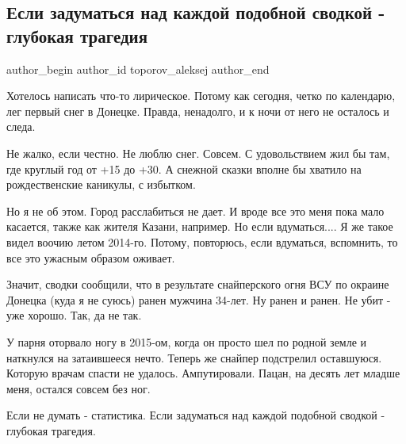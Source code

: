  
 
 
 
 
 
\subsection{Если задуматься над каждой подобной сводкой - глубокая трагедия}
\label{sec:01_12_2021.fb.toporov_aleksej.1.svodki_vojna}
 
\ifcmt
 author_begin
   author_id toporov_aleksej
 author_end
\fi

Хотелось написать что-то лирическое. Потому как сегодня, четко по календарю,
лег первый снег в Донецке. Правда, ненадолго, и к ночи от него не осталось и
следа.

Не жалко, если честно. Не люблю снег. Совсем. С удовольствием жил бы там, где
круглый год от +15 до +30. А снежной сказки вполне бы хватило на рождественские
каникулы, с избытком.

Но я не об этом. Город расслабиться не дает. И вроде все это меня пока мало
касается, также как жителя Казани, например. Но если вдуматься.... Я же такое
видел воочию летом 2014-го. Потому, повторюсь, если вдуматься, вспомнить, то
все это ужасным образом оживает.

Значит, сводки сообщили, что в результате снайперского огня ВСУ по окраине
Донецка (куда я не суюсь) ранен мужчина 34-лет. Ну ранен и ранен. Не убит - уже
хорошо. Так, да не так. 

У парня оторвало ногу в 2015-ом, когда он просто шел по родной земле и
наткнулся на затаившееся нечто. Теперь же снайпер подстрелил оставшуюся.
Которую врачам спасти не удалось. Ампутировали. Пацан, на десять лет младше
меня, остался совсем без ног. 

Если не думать - статистика. Если задуматься над каждой подобной сводкой -
глубокая трагедия.

